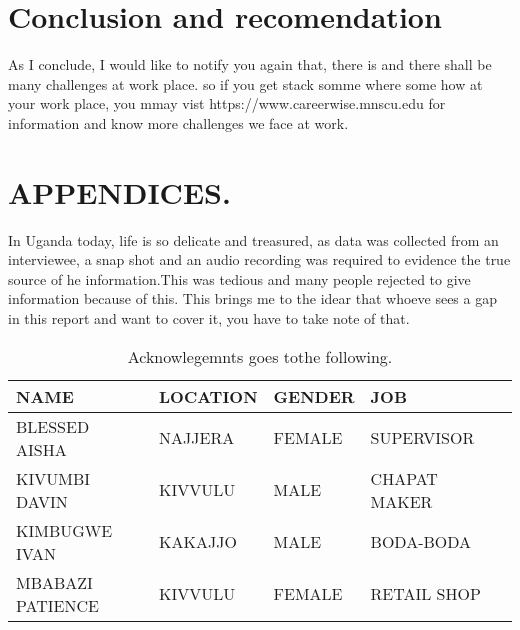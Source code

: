 \documentclass{article}
\begin{document}
\section{Conclusion and recomendation}
As I conclude, I would like to notify you again that, there is and there shall be many challenges at work place. so if you get stack somme where some how at your work place, you mmay vist https://www.careerwise.mnscu.edu for information and know more challenges we face at work.

\section{APPENDICES.}
In Uganda today, life is so delicate and treasured, as data was collected from an interviewee, a snap shot and an audio recording was required to evidence the true source of he information.This was tedious and many people rejected to give information because of this. This brings me to the idear that whoeve sees a gap in this report and want to cover it, you have to take note of that. 

\begin{table}[]
\centering
\caption{Acknowlegemnts  goes tothe following. }
\label{my-label}
\begin{tabular}{|l|l|l|l|l|}
\hline
NAME & LOCATION & GENDER & JOB  \\ \hline
BLESSED AISHA      &  NAJJERA                  & FEMALE          &    SUPERVISOR         \\ \hline
KIVUMBI DAVIN              & KIVVULU                    &  MALE  & 	CHAPAT MAKER                 \\ \hline
KIMBUGWE IVAN               & KAKAJJO                 &  MALE  &    BODA-BODA            \\ \hline
MBABAZI PATIENCE      &  KIVVULU                & FEMALE   & RETAIL SHOP    \\ \hline
\end{tabular}
\end{table}
\end{document}
